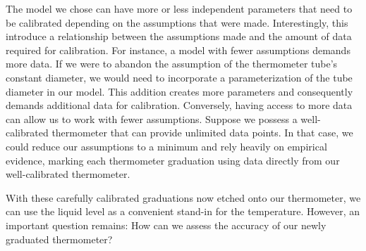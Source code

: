 \begin{bibunit}
  The model we chose can have more or less independent parameters that need to be calibrated depending on the assumptions that were made.
  Interestingly, this introduce a relationship between the assumptions made and the amount of data required for calibration. For instance, a model with fewer assumptions demands more data. If we were to abandon the assumption of the thermometer tube's constant diameter, we would need to incorporate a parameterization of the tube diameter in our model. This addition creates more parameters and consequently demands additional data for calibration. Conversely, having access to more data can allow us to work with fewer assumptions. Suppose we possess a well-calibrated thermometer that can provide unlimited data points. In that case, we could reduce our assumptions to a minimum and rely heavily on empirical evidence, marking each thermometer graduation using data directly from our well-calibrated thermometer.

With these carefully calibrated graduations now etched onto our thermometer, we can use the liquid level as a convenient stand-in for the temperature. However, an important question remains: How can we assess the accuracy of our newly graduated thermometer?

\begin{figure}[h]
\centering
\begin{tabular}{ccc}


\end{tabular}
\end{figure}
\end{bibunit}
